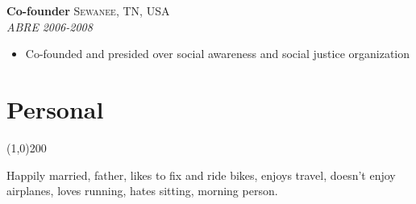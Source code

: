 \documentclass[11pt]{article}
\begin{document}
\noindent \textbf{Co-founder} \hfill \textsc{Sewanee, TN, USA}\\
\noindent \emph{ABRE} \hfill \emph{2006-2008}
\vspace{-2mm}
\begin{itemize}\itemsep0pt \parskip0pt 
\item Co-founded and presided over social awareness and social justice organization
\end{itemize}






\section*{Personal} %
\vspace{-7mm}
\line(1,0){200}
\vspace{2mm}

\noindent Happily married, father, likes to fix and ride bikes, enjoys travel, doesn't enjoy airplanes, loves running, hates sitting, morning person.
\end{document}
